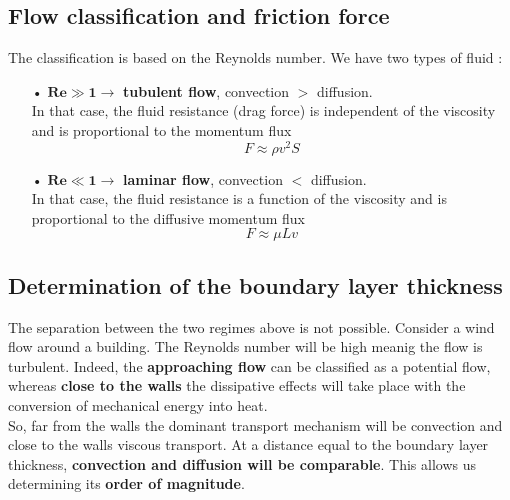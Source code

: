 \subsection{Flow classification and friction force}
	The classification is based on the Reynolds number. We have two types of fluid : \\
	
	\begin{itemize}
		\item[•] $\mathbf{Re \gg 1 \rightarrow}$ \textbf{tubulent flow}, convection $>$ diffusion. \\
		In that case, the fluid resistance (drag force) is independent of the viscosity and is proportional to the momentum flux 
		\begin{equation}
			F \approx \rho v^2 S
		\end{equation}

		\item[•] $\mathbf{Re \ll 1 \rightarrow}$ \textbf{laminar flow}, convection $<$ diffusion. \\
		In that case, the fluid resistance is a function of the viscosity and is proportional to the diffusive momentum flux
		\begin{equation}
			F \approx \mu L v
		\end{equation}
	\end{itemize}
	
\subsection{Determination of the boundary layer thickness}
	The separation between the two regimes above is not possible. Consider a wind flow around a building. The Reynolds number will be high meanig the flow is turbulent. Indeed, the \textbf{approaching flow} can be classified as a potential flow, whereas \textbf{close to the walls} the dissipative effects will take place with the conversion of mechanical energy into heat. \\
	So, far from the walls the dominant transport mechanism will be convection and close to the walls viscous transport. At a distance equal to the boundary layer thickness, \textbf{convection and diffusion will be comparable}. This allows us determining its \textbf{order of magnitude}.
	
